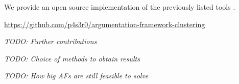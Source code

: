 We provide an open source implementation of the previously listed tools \cite{Pasero2024-AFClustering-Repo}.

\begin{center}
    \url{https://github.com/p4s3r0/argumentation-framework-clustering}
\end{center}

\noindent

\textit{TODO: Further contributions}

\textit{TODO: Choice of methods to obtain results}

\textit{TODO: How big AFs are still feasible to solve}
